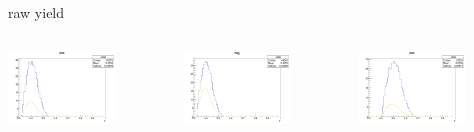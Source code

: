 \begin{frame}{raw yield}
\begin{columns}
\begin{column}[T]{0.25\textwidth}
\includegraphics[width = 0.7\textwidth]{results/yield/statistics/yield_x_Q2_z_0.45_3.898_0.40_pos.png}
\end{column}
\begin{column}[T]{0.25\textwidth}
\includegraphics[width = 0.7\textwidth]{results/yield/statistics/yield_x_Q2_z_0.45_3.898_0.40_neg.png}
\end{column}
\begin{column}[T]{0.25\textwidth}
\includegraphics[width = 0.7\textwidth]{results/yield/statistics/yield_x_Q2_z_0.45_3.898_0.50_pos.png}

\end{column}
\end{columns}
\end{frame}
